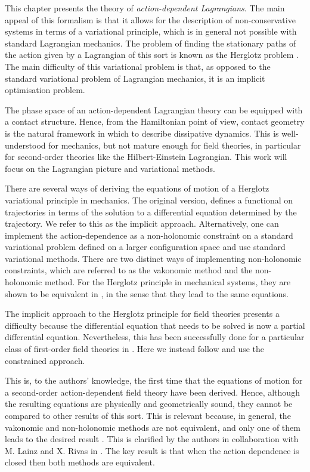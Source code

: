 \documentclass[../main.tex]{subfiles}
\begin{document}
This chapter presents the theory of \emph{action-dependent Lagrangians}. The main appeal of
this formalism is that it allows for the description of non-conservative systems in terms of a
variational principle, which is in general not possible with standard Lagrangian
mechanics. The problem of finding the stationary paths of the action given by a Lagrangian of this sort is known as the Herglotz problem \cite{Herglotz_1930}. The main difficulty of this variational
problem is that, as opposed to the standard variational problem of Lagrangian mechanics,
it is an implicit optimisation problem. 

The phase space of an action-dependent Lagrangian theory can be equipped with a contact structure. Hence, from the Hamiltonian point of view, contact geometry is the natural framework in which to describe dissipative dynamics. This is well-understood for mechanics, but not mature enough for field theories, in particular for  second-order theories like the Hilbert-Einstein Lagrangian. This work will focus on the Lagrangian picture and variational methods.

There are several ways of deriving the equations of motion of a Herglotz variational principle in mechanics. The original version, defines a functional on trajectories in terms of the solution to a differential equation determined by the trajectory. We refer to this as the implicit approach. Alternatively, one can implement the action-dependence as a non-holonomic constraint on a standard variational problem defined on a larger configuration space and use standard variational methods. There are two distinct ways of implementing non-holonomic constraints, which are referred to as the vakonomic method and the non-holonomic method. For the Herglotz principle in mechanical systems, they are shown to be equivalent in \cite{de_leon_constrained_2021}, in the sense that they lead to the same equations.

The implicit approach to the Herglotz principle for field theories presents a difficulty because the differential equation that needs to be solved is now a partial differential equation. Nevertheless, this has been successfully done for a particular class of first-order field theories  in \cite{Georgieva, Lazo2018}. Here we instead follow \cite{de_leon_constrained_2021} and use the constrained approach.

This is, to the authors' knowledge, the first time that the equations of motion for a second-order action-dependent field theory have been derived. Hence, although the resulting equations are physically and geometrically sound, they cannot be compared to other results of this sort. This is relevant because, in general, the vakonomic and non-holonomic methods are not equivalent, and only one of them leads to the desired result \cite{Gra2003}. This is clarified by the authors in collaboration with M. Lainz and X. Rivas in \cite{GLMR-2022}. The key result is that when the action dependence is closed then both methods are equivalent.
\end{document}
